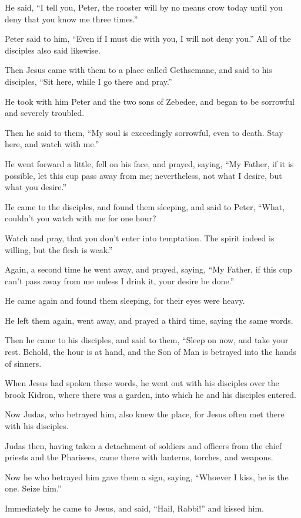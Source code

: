 He said, “I tell you, Peter, the rooster will by no means crow today until you deny that you know me three times.”

Peter said to him, “Even if I must die with you, I will not deny you.” All of the disciples also said likewise.

Then Jesus came with them to a place called Gethsemane, and said to his disciples, “Sit here, while I go there and pray.”

He took with him Peter and the two sons of Zebedee, and began to be sorrowful and severely troubled.

Then he said to them, “My soul is exceedingly sorrowful, even to death. Stay here, and watch with me.”

He went forward a little, fell on his face, and prayed, saying, “My Father, if it is possible, let this cup pass away from me; nevertheless, not what I desire, but what you desire.”

He came to the disciples, and found them sleeping, and said to Peter, “What, couldn’t you watch with me for one hour?

Watch and pray, that you don’t enter into temptation. The spirit indeed is willing, but the flesh is weak.”

Again, a second time he went away, and prayed, saying, “My Father, if this cup can’t pass away from me unless I drink it, your desire be done.”

He came again and found them sleeping, for their eyes were heavy.

He left them again, went away, and prayed a third time, saying the same words.

Then he came to his disciples, and said to them, “Sleep on now, and take your rest. Behold, the hour is at hand, and the Son of Man is betrayed into the hands of sinners.

When Jesus had spoken these words, he went out with his disciples over the brook Kidron, where there was a garden, into which he and his disciples entered.

Now Judas, who betrayed him, also knew the place, for Jesus often met there with his disciples.

Judas then, having taken a detachment of soldiers and officers from the chief priests and the Pharisees, came there with lanterns, torches, and weapons.

Now he who betrayed him gave them a sign, saying, “Whoever I kiss, he is the one. Seize him.”

Immediately he came to Jesus, and said, “Hail, Rabbi!” and kissed him.

